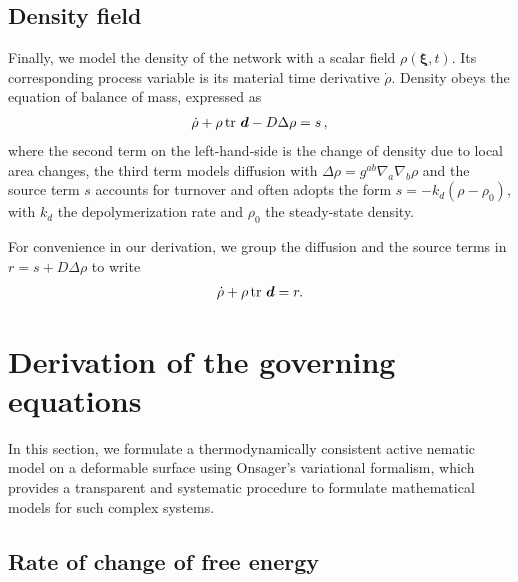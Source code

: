 \subsection{Density field}

Finally, we model the density of the network with a scalar field $\rho(\bm{\xi},t)$. Its corresponding process variable is its material time derivative $\dot\rho$. Density obeys the equation of balance of mass, expressed as
\begin{align}  \label{45_II_}
	\dot\rho  + \rho \, \textup{tr }\bm{d} - D \Delta \rho =  s \, ,
\end{align}
where the second term on the left-hand-side is the change of density due to local area changes, the third term models diffusion with $\Delta \rho = g^{ab}\nabla_a\nabla_b \rho$ and the source term $s$ accounts for turnover and often adopts the form  $s = -k_d(\rho-\rho_0)$, with $k_d$ the depolymerization rate and $\rho_0$ the steady-state density. 

For convenience in our derivation, we group the diffusion and the source terms in $r= s+D \Delta \rho$ to write 
\begin{align}  \label{45_II}
	\dot\rho  + \rho \, \textup{tr }\bm{d}  =  r.
\end{align}

\section{Derivation of the governing equations} \label{sec4_2_2}

In this section, we formulate a thermodynamically consistent active nematic model on a deformable surface using Onsager's variational formalism, which provides a transparent and systematic procedure to formulate mathematical models for such complex systems. 

\subsection{Rate of change of free energy}


